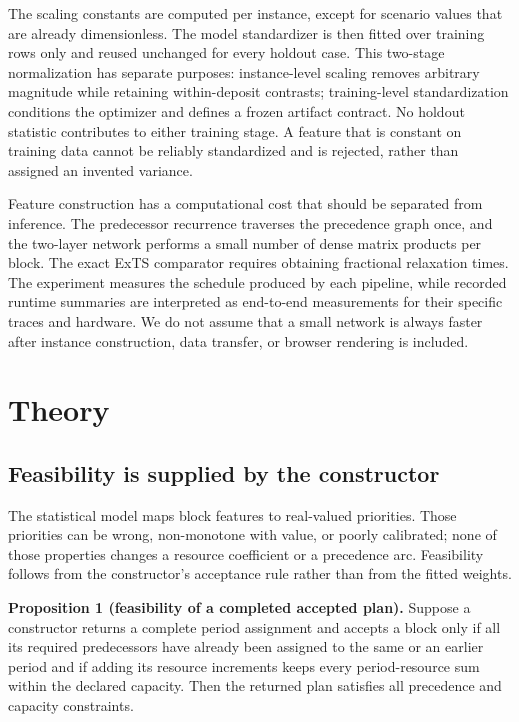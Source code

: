 \documentclass[11pt]{article}
\begin{document}
The scaling constants are computed per instance, except for scenario values that are already dimensionless. The model standardizer is then fitted over training rows only and reused unchanged for every holdout case. This two-stage normalization has separate purposes: instance-level scaling removes arbitrary magnitude while retaining within-deposit contrasts; training-level standardization conditions the optimizer and defines a frozen artifact contract. No holdout statistic contributes to either training stage. A feature that is constant on training data cannot be reliably standardized and is rejected, rather than assigned an invented variance.

Feature construction has a computational cost that should be separated from inference. The predecessor recurrence traverses the precedence graph once, and the two-layer network performs a small number of dense matrix products per block. The exact ExTS comparator requires obtaining fractional relaxation times. The experiment measures the schedule produced by each pipeline, while recorded runtime summaries are interpreted as end-to-end measurements for their specific traces and hardware. We do not assume that a small network is always faster after instance construction, data transfer, or browser rendering is included.

\section{Theory}
\subsection{Feasibility is supplied by the constructor}
The statistical model maps block features to real-valued priorities. Those priorities can be wrong, non-monotone with value, or poorly calibrated; none of those properties changes a resource coefficient or a precedence arc. Feasibility follows from the constructor's acceptance rule rather than from the fitted weights.

\textbf{Proposition 1 (feasibility of a completed accepted plan).} Suppose a constructor returns a complete period assignment and accepts a block only if all its required predecessors have already been assigned to the same or an earlier period and if adding its resource increments keeps every period-resource sum within the declared capacity. Then the returned plan satisfies all precedence and capacity constraints.
\end{document}
